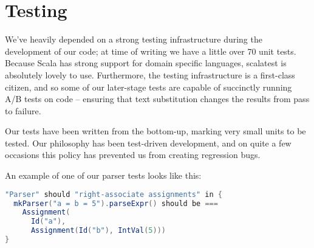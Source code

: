 \documentclass{article}
\begin{document}
\section{Testing}

We've heavily depended on a strong testing infrastructure during the development of our code; at time of writing we have
a little over 70 unit tests. Because Scala has strong support for domain specific languages, scalatest is absolutely
lovely to use. Furthermore, the testing infrastructure is a first-class citizen, and so some of our later-stage tests
are capable of succinctly running A/B tests on code -- ensuring that text substitution changes the results from pass to
failure.

Our tests have been written from the bottom-up, marking very small units to be tested. Our philosophy has been
test-driven development, and on quite a few occasions this policy has prevented us from creating regression bugs.

An example of one of our parser tests looks like this:

\begin{lstlisting}[language=Scala]
"Parser" should "right-associate assignments" in {
  mkParser("a = b = 5").parseExpr() should be ===
    Assignment(
      Id("a"),
      Assignment(Id("b"), IntVal(5)))
}
\end{lstlisting}

\testsrc{*}
\end{document}
